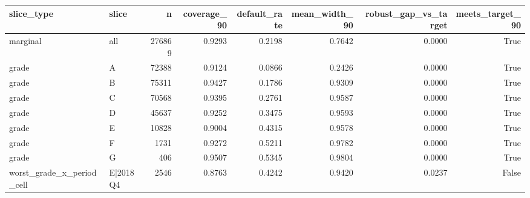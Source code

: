 \begin{tabular}{llrrrrrr}
\toprule
slice\_type & slice & n & coverage\_90 & default\_rate & mean\_width\_90 & robust\_gap\_vs\_target & meets\_target\_90 \\
\midrule
marginal & all & 276869 & 0.9293 & 0.2198 & 0.7642 & 0.0000 & True \\
grade & A & 72388 & 0.9124 & 0.0866 & 0.2426 & 0.0000 & True \\
grade & B & 75311 & 0.9427 & 0.1786 & 0.9309 & 0.0000 & True \\
grade & C & 70568 & 0.9395 & 0.2761 & 0.9587 & 0.0000 & True \\
grade & D & 45637 & 0.9252 & 0.3475 & 0.9593 & 0.0000 & True \\
grade & E & 10828 & 0.9004 & 0.4315 & 0.9578 & 0.0000 & True \\
grade & F & 1731 & 0.9272 & 0.5211 & 0.9782 & 0.0000 & True \\
grade & G & 406 & 0.9507 & 0.5345 & 0.9804 & 0.0000 & True \\
worst\_grade\_x\_period\_cell & E|2018Q4 & 2546 & 0.8763 & 0.4242 & 0.9420 & 0.0237 & False \\
\bottomrule
\end{tabular}
